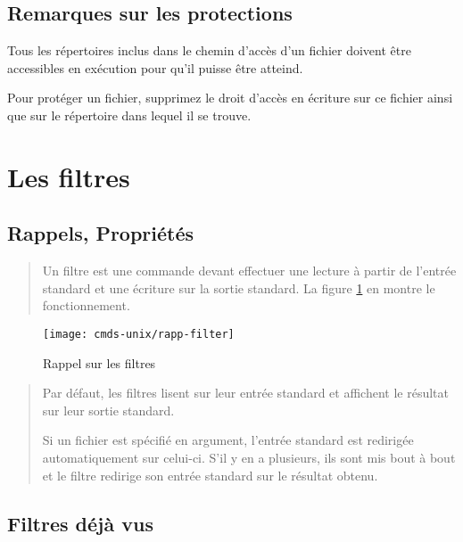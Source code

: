 \subsection{Remarques sur les protections}

Tous les r{\'e}pertoires inclus dans le chemin d'acc{\`e}s d'un fichier doivent
{\^e}tre accessibles en ex{\'e}cution pour qu'il  puisse {\^e}tre atteind.

Pour prot{\'e}ger un fichier, supprimez le droit d'acc{\`e}s en {\'e}criture sur ce
fichier ainsi que sur le r{\'e}pertoire dans lequel il se trouve.

\section{Les filtres}

\subsection{Rappels, Propri{\'e}t{\'e}s}

\begin{quote}
Un filtre est une commande devant effectuer une lecture {\`a} partir de
l'entr{\'e}e standard et une {\'e}criture sur la sortie standard. La figure
\ref{fig-cmds-rapp-filter} en montre le fonctionnement.
\end{quote}

\begin{figure}[hbtp]
\centering
\texttt{[image: cmds-unix/rapp-filter]}
\caption{\label{fig-cmds-rapp-filter}Rappel sur les filtres}
\end{figure}

\begin{quote}
Par d{\'e}faut, les filtres lisent sur leur entr{\'e}e standard et affichent le
r{\'e}sultat sur leur sortie standard.

Si un fichier est sp{\'e}cifi{\'e} en argument, l'entr{\'e}e standard est redirig{\'e}e
automatiquement sur celui-ci. S'il y en a plusieurs, ils sont mis bout {\`a}
bout et le filtre redirige son entr{\'e}e standard sur le r{\'e}sultat obtenu.
\end{quote}

\subsection{Filtres d{\'e}j{\`a} vus}

